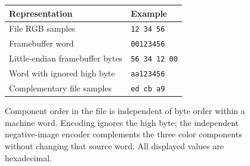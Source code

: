 \begin{figure}[htbp]
  \centering
  \begin{tabular}{l l}
    \toprule
    Representation                  & Example              \\
    \midrule
    File RGB samples                & \texttt{12 34 56}    \\
    Framebuffer word                & \texttt{00123456}    \\
    Little-endian framebuffer bytes & \texttt{56 34 12 00} \\
    Word with ignored high byte     & \texttt{aa123456}    \\
    Complementary file samples      & \texttt{ed cb a9}    \\
    \bottomrule
  \end{tabular}
  \caption{Component order in the file is independent of byte order within a machine word. Encoding ignores the high byte; the independent negative-image encoder complements the three color components without changing that source word. All displayed values are hexadecimal.}
  \label{fig:revision-ppm-order}
\end{figure}
